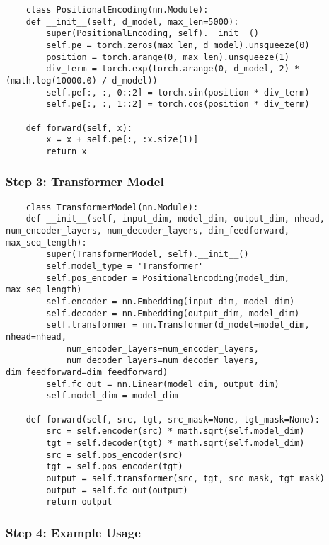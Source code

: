 \documentclass{article}
\begin{document}
\begin{lstlisting}
    class PositionalEncoding(nn.Module):
    def __init__(self, d_model, max_len=5000):
        super(PositionalEncoding, self).__init__()
        self.pe = torch.zeros(max_len, d_model).unsqueeze(0)
        position = torch.arange(0, max_len).unsqueeze(1)
        div_term = torch.exp(torch.arange(0, d_model, 2) * -(math.log(10000.0) / d_model))
        self.pe[:, :, 0::2] = torch.sin(position * div_term)
        self.pe[:, :, 1::2] = torch.cos(position * div_term)

    def forward(self, x):
        x = x + self.pe[:, :x.size(1)]
        return x
\end{lstlisting}

\subsubsection*{Step 3: Transformer Model}

\begin{lstlisting}
    class TransformerModel(nn.Module):
    def __init__(self, input_dim, model_dim, output_dim, nhead, num_encoder_layers, num_decoder_layers, dim_feedforward, max_seq_length):
        super(TransformerModel, self).__init__()
        self.model_type = 'Transformer'
        self.pos_encoder = PositionalEncoding(model_dim, max_seq_length)
        self.encoder = nn.Embedding(input_dim, model_dim)
        self.decoder = nn.Embedding(output_dim, model_dim)
        self.transformer = nn.Transformer(d_model=model_dim, nhead=nhead, 
            num_encoder_layers=num_encoder_layers,
            num_decoder_layers=num_decoder_layers, dim_feedforward=dim_feedforward)
        self.fc_out = nn.Linear(model_dim, output_dim)
        self.model_dim = model_dim

    def forward(self, src, tgt, src_mask=None, tgt_mask=None):
        src = self.encoder(src) * math.sqrt(self.model_dim)
        tgt = self.decoder(tgt) * math.sqrt(self.model_dim)
        src = self.pos_encoder(src)
        tgt = self.pos_encoder(tgt)
        output = self.transformer(src, tgt, src_mask, tgt_mask)
        output = self.fc_out(output)
        return output
\end{lstlisting}

\subsubsection*{Step 4: Example Usage}
\end{document}

